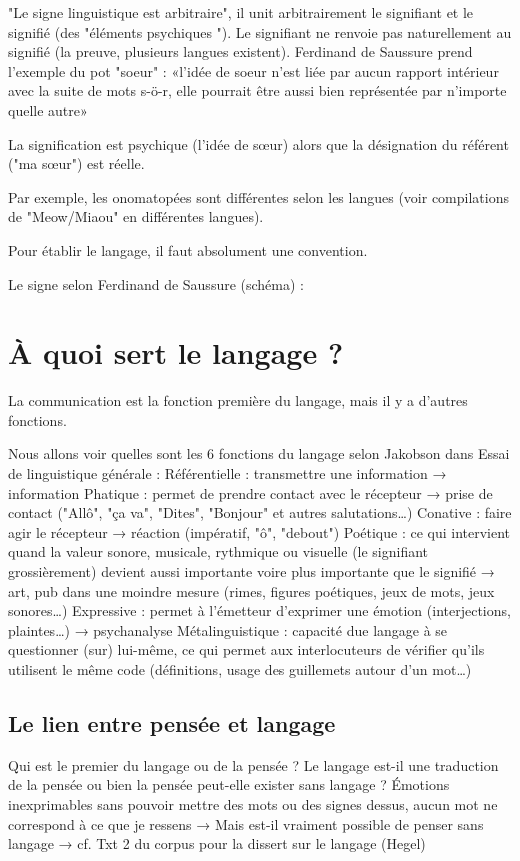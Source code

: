 \documentclass[french]{book}
\theoremstyle{definition}
\begin{document}
"Le signe linguistique est arbitraire", il unit arbitrairement le signifiant et le signifié (des "éléments psychiques "). Le signifiant ne renvoie pas naturellement au signifié (la preuve, plusieurs langues existent).
Ferdinand de Saussure prend l'exemple du pot "soeur" : «l'idée de soeur n'est liée par aucun rapport intérieur avec la suite de mots s-ö-r, elle pourrait être aussi bien représentée par n'importe quelle autre»

La signification est psychique (l'idée de sœur) alors que la désignation du référent ("ma sœur") est réelle.

Par exemple, les onomatopées sont différentes selon les langues (voir compilations de "Meow/Miaou" en différentes langues).

Pour établir le langage, il faut absolument une convention.

Le signe selon Ferdinand de Saussure (schéma) :


\section{À quoi sert le langage ?}

La communication est la fonction première du langage, mais il y a d'autres fonctions.

Nous allons voir quelles sont les 6 fonctions du langage selon Jakobson dans Essai de linguistique générale :
Référentielle : transmettre une information → information
Phatique : permet de prendre contact avec le récepteur → prise de contact ("Allô", "ça va", "Dites", "Bonjour" et autres salutations…)
Conative : faire agir le récepteur → réaction (impératif, "ô", "debout")
Poétique : ce qui intervient quand la valeur sonore, musicale, rythmique ou visuelle (le signifiant grossièrement) devient aussi importante voire plus importante que le signifié → art, pub dans une moindre mesure (rimes, figures poétiques, jeux de mots, jeux sonores…)
Expressive : permet à l'émetteur d'exprimer une émotion (interjections, plaintes…) → psychanalyse
Métalinguistique : capacité due langage à se questionner (sur) lui-même, ce qui permet aux interlocuteurs de vérifier qu'ils utilisent le même code (définitions, usage des guillemets autour d'un mot…)

\subsection{Le lien entre pensée et langage}

Qui est le premier du langage ou de la pensée ?
Le langage est-il une traduction de la pensée ou bien la pensée peut-elle exister sans langage ?
Émotions inexprimables sans pouvoir mettre des mots ou des signes dessus, aucun mot ne correspond à ce que je ressens → Mais est-il vraiment possible de penser sans langage → cf. Txt 2 du corpus pour la dissert sur le langage (Hegel)
\end{document}
